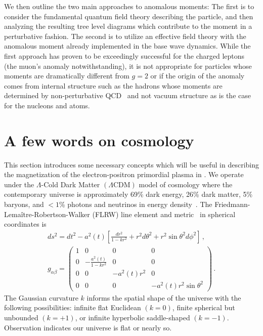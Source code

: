 We then outline the two main approaches to anomalous moments: The first is to consider the fundamental quantum field theory describing the particle, and then analyzing the resulting tree level diagrams which contribute to the moment in a perturbative fashion. The second is to utilize an effective field theory with the anomalous moment already implemented in the base wave dynamics. While the first approach has proven to be exceedingly successful for the charged leptons (the muon's anomaly notwithstanding), it is not appropriate for particles whose moments are dramatically different from $g\!=\!2$ or if the origin of the anomaly comes from internal structure such as the hadrons whose moments are determined by non-perturbative QCD~\citep{Eichmann:2016yit,Pacetti:2014jai} and not vacuum structure as is the case for the nucleons and atoms.

\section{A few words on cosmology}
\label{sec:flrw}
\noindent This section introduces some necessary concepts which will be useful in describing the magnetization of the electron-positron primordial plasma in . We operate under the $\Lambda$-Cold Dark Matter $(\Lambda\mathrm{CDM})$ model of cosmology where the contemporary universe is approximately 69\% dark energy, 26\% dark matter, 5\% baryons, and $<1$\% photons and neutrinos in energy density~\citep{Davis:2003ad,Planck:2018vyg}. The Friedmann-Lema{\^i}tre-Robertson-Walker (FLRW) line element and metric~\citep{weinberg1972gravitation} in spherical coordinates is
\begin{gather}
    \label{FLRW} ds^2=dt^2-a^2(t)\left[\frac{dr^2}{1-kr^{2}}+r^{2}d\theta^2+r^{2}\sin\theta^{2}d\phi^2\right]\,,\\
    g_{\alpha\beta}=
    \begin{pmatrix}
        1&0&0&0\\
        0&-\frac{a^{2}(t)}{1-kr^{2}}&0&0\\
        0&0&-a^{2}(t)r^{2}&0\\
        0&0&0&-a^{2}(t)r^{2}\sin\theta^{2}
    \end{pmatrix}\,.
\end{gather}
The Gaussian curvature $k$ informs the spatial shape of the universe with the following possibilities: infinite flat Euclidean $(k=0)$, finite spherical but unbounded $(k=+1)$, or infinite hyperbolic saddle-shaped $(k=-1)$. Observation indicates our universe is flat or nearly so.

